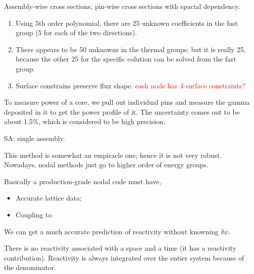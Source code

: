 \documentclass{school-22.211-notes}
\date{May  9, 2012}
\begin{document}
\maketitle

Assembly-wise cross sections, pin-wise cross sections with spacial dependency. 




\begin{enumerate}
\item Using 5th order polynomial, there are 25 unknown coefficients in the fast group (5 for each of the two directions). 
\item There appears to be 50 unknowns in the thermal groups; but it is really 25, because the other 25 for the specific colution can be solved from the fast group.
\item Surface constrains preserve flux shape. 
\textcolor{red}{each node has 4 surface constraints?} 
\end{enumerate}





To measure power of a core, we pull out individual pins and measure the gamma deposited in it to get the power profile of it. The uncertainty comes out to be about 1.5\%, which is considered to be high precision. 


SA: single assembly. 

This method is somewhat an empiracle one; hence it is not very robust. Nowadays, nodal methods just go to higher order of energy groups. 

\clearpage
{}
Basically a production-grade nodal code must have, 
\begin{itemize}
\item Accurate lattice data;
\item Coupling to 
\end{itemize}



We can get a much accurate prediction of reactivity without knowning $\delta \psi$. 



There is no reactivity associated with a space and a time (it has a reactivity contribution). Reactivity is always integrated over the entier system because of the denominator. 
\end{document}
